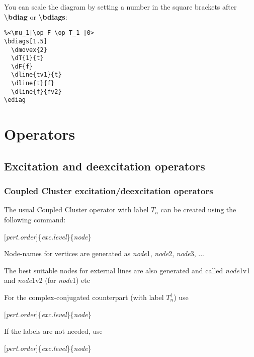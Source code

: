 \documentclass[a4paper]{article}
\newcommand{\myind}{\hspace{10pt}}
\begin{document}
You can scale the diagram by setting a number in the square brackets after {\bf \textbackslash bdiag}
or {\bf \textbackslash bdiags}:
\begin{table}[ht]
 \begin{minipage}[b]{0.5\linewidth}\centering
  \begin{lstlisting}
%<\mu_1|\op F \op T_1 |0>
\bdiags[1.5]
  \dmovex{2}
  \dT{1}{t}
  \dF{f}
  \dline{tv1}{t}
  \dline{t}{f}
  \dline{f}{fv2}
\ediag 
  \end{lstlisting}
 \end{minipage}
 \begin{minipage}[b]{0.5\linewidth}\centering
    \bdiags[1.5]
    \ediag
 \end{minipage}
\end{table}


\section{Operators}

\subsection{Excitation and deexcitation operators}

\subsubsection{Coupled Cluster excitation/deexcitation operators}

The usual Coupled Cluster operator with label $T_{n}$ can be created using the following command:

\myind{\bf \textbackslash dT}$[${\it pert.order}$]$\{{\it exc.level}\}\{{\it node}\}

Node-names for vertices are generated as {\it node}1, {\it node}2, {\it node}3, ...

The best suitable nodes for external lines are also generated and called {\it node}1v1 and {\it node}1v2 
(for {\it node}1) etc

For the complex-conjugated counterpart (with label $T^{\dagger}_{n}$) use 

\myind{\bf \textbackslash dTd}$[${\it pert.order}$]$\{{\it exc.level}\}\{{\it node}\}

If the labels are not needed, use

\myind{\bf \textbackslash dTs}$[${\it pert.order}$]$\{{\it exc.level}\}\{{\it node}\}
\end{document}
